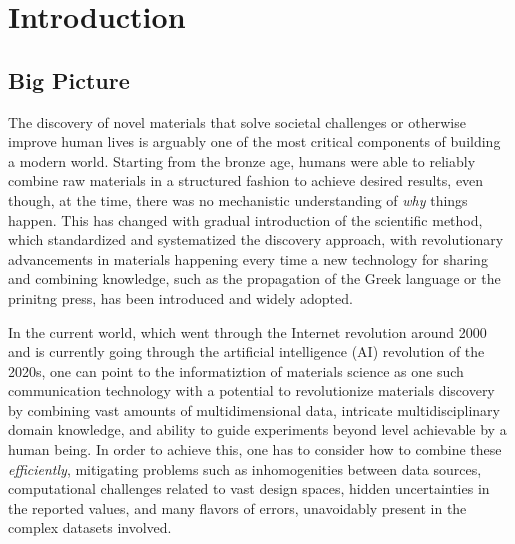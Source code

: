 \chapter{Introduction} \label{sec:Introduction}

\section{Big Picture} \label{intro:sec:bigpicture}

The discovery of novel materials that solve societal challenges or otherwise improve human lives is arguably one of the most critical components of building a modern world. Starting from the bronze age, humans were able to reliably combine raw materials in a structured fashion to achieve desired results, even though, at the time, there was no mechanistic understanding of \emph{why} things happen. This has changed with gradual introduction of the scientific method, which standardized and systematized the discovery approach, with revolutionary advancements in materials happening every time a new technology for sharing and combining knowledge, such as the propagation of the Greek language or the prinitng press, has been introduced and widely adopted.

In the current world, which went through the Internet revolution around 2000 and is currently going through the artificial intelligence (AI) revolution of the 2020s, one can point to the informatiztion of materials science as one such communication technology with a potential to revolutionize materials discovery by combining vast amounts of multidimensional data, intricate multidisciplinary domain knowledge, and ability to guide experiments beyond level achievable by a human being. In order to achieve this, one has to consider how to combine these \emph{efficiently}, mitigating problems such as inhomogenities between data sources, computational challenges related to vast design spaces, hidden uncertainties in the reported values, and many flavors of errors, unavoidably present in the complex datasets involved.

